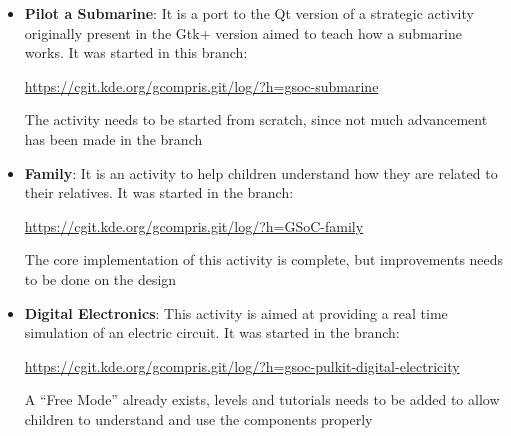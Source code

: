 \documentclass[preprint,12pt]{elsarticle}
\begin{document}
\begin{itemize}

\item \textbf{Pilot a Submarine}: It is a port to the Qt version of a strategic activity originally present in the Gtk+ version aimed to teach how a submarine works. It was started in this branch: 

\href{https://cgit.kde.org/gcompris.git/log/?h=gsoc-submarine}{https://cgit.kde.org/gcompris.git/log/?h=gsoc-submarine}

The activity needs to be started from scratch, since not much advancement has been made in the branch

\item \textbf{Family}: It is an activity to help children understand how they are related to their relatives. It was started in the branch:

\href{https://cgit.kde.org/gcompris.git/log/?h=GSoC-family}{https://cgit.kde.org/gcompris.git/log/?h=GSoC-family}

The core implementation of this activity is complete, but improvements needs to be done on the design

\item \textbf{Digital Electronics}: This activity is aimed at providing a real time simulation of an electric circuit. It was started in the branch:

\href{https://cgit.kde.org/gcompris.git/log/?h=gsoc_pulkit_digital_electricity}{https://cgit.kde.org/gcompris.git/log/?h=gsoc-pulkit-digital-electricity}

A “Free Mode” already exists, levels and tutorials needs to be added to allow children to understand and use the components properly

\end{itemize}





\end{document}
